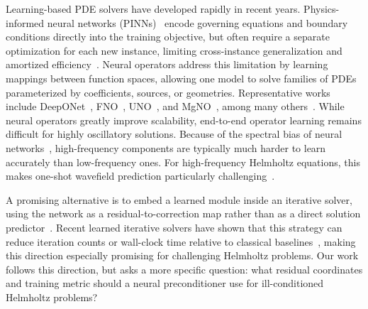 \documentclass{article}
\theoremstyle{plain}
\theoremstyle{remark}
\begin{document}
Learning-based PDE solvers have developed rapidly in recent years. Physics-informed neural networks (PINNs)~\cite{raissi2019physics} encode governing equations and boundary conditions directly into the training objective, but often require a separate optimization for each new instance, limiting cross-instance generalization and amortized efficiency~\cite{sun2020surrogate}. Neural operators address this limitation by learning mappings between function spaces, allowing one model to solve families of PDEs parameterized by coefficients, sources, or geometries. Representative works include DeepONet~\cite{lu2021learning}, FNO~\cite{li2020fourier,li2023fourier}, UNO~\cite{rahman2022u}, and MgNO~\cite{he2024mgno}, among many others~\cite{kovachki2023neural,cao2021choose,MELCHERS2026118893}.
While neural operators greatly improve scalability, end-to-end operator learning remains difficult for highly oscillatory solutions. Because of the spectral bias of neural networks~\cite{rahaman2019spectral,liu2024mitigating}, high-frequency components are typically much harder to learn accurately than low-frequency ones. For high-frequency Helmholtz equations, this makes one-shot wavefield prediction particularly challenging~\cite{he2025self}.

A promising alternative is to embed a learned module inside an iterative solver, using the network as a residual-to-correction map rather than as a direct solution predictor~\cite{kopanivcakova2025leveraging,rudikov2024neural,zhang2024blending}. Recent learned iterative solvers have shown that this strategy can reduce iteration counts or wall-clock time relative to classical baselines~\cite{xie2025mgcfnn}, making this direction especially promising for challenging Helmholtz problems.
Our work follows this direction, but asks a more specific question: what residual coordinates and training metric should a neural preconditioner use for ill-conditioned Helmholtz problems?
\end{document}
